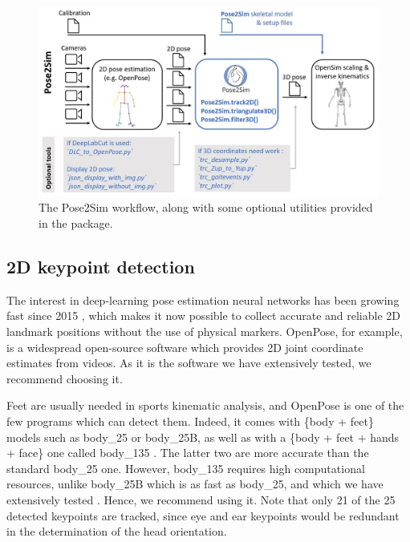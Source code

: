 \begin{figure}[hbtp]
	\centering
	\def\svgwidth{1\columnwidth}
	\fontsize{10pt}{10pt}\selectfont
	\includegraphics[width=\linewidth]{"../Chap3/Figures/Pose2Sim_utilities.jpg"}
	\caption{The Pose2Sim workflow, along with some optional utilities provided in the package.}
	\label{fig_opensimutilities}
\end{figure}


\subsection{2D keypoint detection}

The interest in deep-learning pose estimation neural networks has been growing fast since 2015 \cite{Zheng2022}, which makes it now possible to collect accurate and reliable 2D landmark positions without the use of physical markers. OpenPose, for example, is a widespread open-source software which provides 2D joint coordinate estimates from videos. As it is the software we have extensively tested, we recommend choosing it.

Feet are usually needed in sports kinematic analysis, and OpenPose is one of the few programs which can detect them. Indeed, it comes with \{body + feet\} models such as body\_25 or body\_25B, as well as with a \{body + feet + hands + face\} one called body\_135 \cite{Hidalgo2019}. The latter two are more accurate than the standard body\_25 one. However, body\_135 requires high computational resources, unlike body\_25B which is as fast as body\_25, and which we have extensively tested \cite{Pagnon2022a}. Hence, we recommend using it. Note that only 21 of the 25 detected keypoints are tracked, since eye and ear keypoints would be redundant in the determination of the head orientation. 

